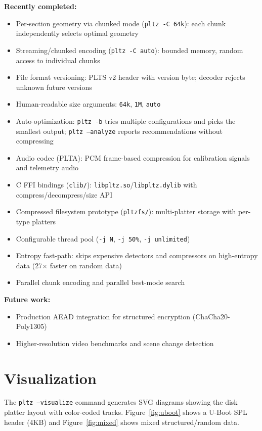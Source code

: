 \documentclass[11pt,a4paper]{article}
\begin{document}
\textbf{Recently completed:}
\begin{itemize}
\item Per-section geometry via chunked mode (\texttt{pltz -C 64k}): each chunk independently selects optimal geometry
\item Streaming/chunked encoding (\texttt{pltz -C auto}): bounded memory, random access to individual chunks
\item File format versioning: PLTS v2 header with version byte; decoder rejects unknown future versions
\item Human-readable size arguments: \texttt{64k}, \texttt{1M}, \texttt{auto}
\item Auto-optimization: \texttt{pltz -b} tries multiple configurations and picks the smallest output; \texttt{pltz --analyze} reports recommendations without compressing
\item Audio codec (PLTA): PCM frame-based compression for calibration signals and telemetry audio
\item C FFI bindings (\texttt{clib/}): \texttt{libpltz.so}/\texttt{libpltz.dylib} with compress/decompress/size API
\item Compressed filesystem prototype (\texttt{pltzfs/}): multi-platter storage with per-type platters
\item Configurable thread pool (\texttt{-j N}, \texttt{-j 50\%}, \texttt{-j unlimited})
\item Entropy fast-path: skips expensive detectors and compressors on high-entropy data (27$\times$ faster on random data)
\item Parallel chunk encoding and parallel best-mode search
\end{itemize}

\textbf{Future work:}
\begin{itemize}
\item Production AEAD integration for structured encryption (ChaCha20-Poly1305)
\item Higher-resolution video benchmarks and scene change detection
\end{itemize}

\section{Visualization}

The \texttt{pltz --visualize} command generates SVG diagrams showing the disk platter layout with color-coded tracks. Figure~\ref{fig:uboot} shows a U-Boot SPL header (4KB) and Figure~\ref{fig:mixed} shows mixed structured/random data.
\end{document}
